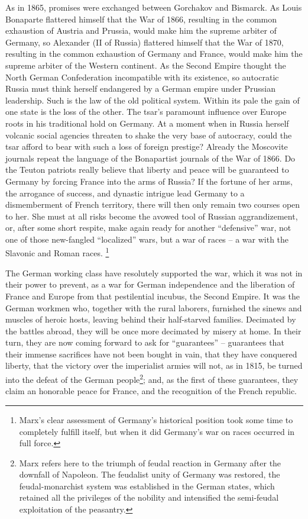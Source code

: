 \documentclass{book}
\begin{document}
As in 1865, promises were exchanged between Gorchakov and Bismarck. As
Louis Bonaparte flattered himself that the War of 1866, resulting in the
common exhaustion of Austria and Prussia, would make him the supreme
arbiter of Germany, so Alexander (II of Russia) flattered himself that the
War of 1870, resulting in the common exhaustion of Germany and France,
would make him the supreme arbiter of the Western continent. As the Second
Empire thought the North German Confederation incompatible with its
existence, so autocratic Russia must think herself endangered by a German
empire under Prussian leadership. Such is the law of the old political
system. Within its pale the gain of one state is the loss of the other.
The tsar’s paramount influence over Europe roots in his traditional hold
on Germany. At a moment when in Russia herself volcanic social agencies
threaten to shake the very base of autocracy, could the tsar afford to
bear with such a loss of foreign prestige? Already the Moscovite journals
repeat the language of the Bonapartist journals of the War of 1866. Do the
Teuton patriots really believe that liberty and peace will be guaranteed
to Germany by forcing France into the arms of Russia? If the fortune of
her arms, the arrogance of success, and dynastic intrigue lead Germany to
a dismemberment of French territory, there will then only remain two
courses open to her. She must at all risks become the avowed tool of
Russian aggrandizement, or, after some short respite, make again ready for
another “defensive” war, not one of those new-fangled “localized” wars,
but a war of races – a war with the Slavonic and Roman races.
\footnote{Marx’s clear assessment of Germany’s historical position took
some time to completely fulfill itself, but when it did Germany’s war on
races occurred in full force.}

The German working class have resolutely supported the war, which it was
not in their power to prevent, as a war for German independence and the
liberation of France and Europe from that pestilential incubus, the Second
Empire. It was the German workmen who, together with the rural laborers,
furnished the sinews and muscles of heroic hosts, leaving behind their
half-starved families. Decimated by the battles abroad, they will be once
more decimated by misery at home. In their turn, they are now coming
forward to ask for “guarantees” – guarantees that their immense sacrifices
have not been bought in vain, that they have conquered liberty, that the
victory over the imperialist armies will not, as in 1815, be turned into
the defeat of the German people\footnote{Marx refers here to the triumph
of feudal reaction in Germany after the downfall of Napoleon. The
feudalist unity of Germany was restored, the feudal-monarchist system was
established in the German states, which retained all the privileges of the
nobility and intensified the semi-feudal exploitation of the peasantry.};
and, as the first of these guarantees, they claim an honorable peace for
France, and the recognition of the French republic.
\end{document}
